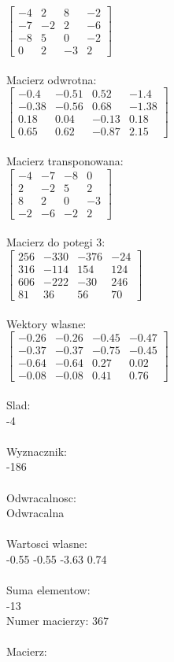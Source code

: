 \documentclass[a4paper,12pt]{article}
\begin{document}
$\begin{bmatrix} -4&2&8&-2\\-7&-2&2&-6\\-8&5&0&-2\\0&2&-3&2 \end{bmatrix}$
\\
\\
Macierz odwrotna:\\

$\begin{bmatrix} -0.4&-0.51&0.52&-1.4\\-0.38&-0.56&0.68&-1.38\\0.18&0.04&-0.13&0.18\\0.65&0.62&-0.87&2.15 \end{bmatrix}$
\\
\\
Macierz transponowana:\\

$\begin{bmatrix} -4&-7&-8&0\\2&-2&5&2\\8&2&0&-3\\-2&-6&-2&2 \end{bmatrix}$
\\
\\
Macierz do potegi 3:\\

$\begin{bmatrix} 256&-330&-376&-24\\316&-114&154&124\\606&-222&-30&246\\81&36&56&70 \end{bmatrix}$
\\
\\
Wektory wlasne:\\

$\begin{bmatrix} -0.26&-0.26&-0.45&-0.47\\-0.37&-0.37&-0.75&-0.45\\-0.64&-0.64&0.27&0.02\\-0.08&-0.08&0.41&0.76 \end{bmatrix}$
\\
\\
Slad:\\
-4
\\
\\
Wyznacznik:\\
-186
\\
\\
Odwracalnosc:\\
Odwracalna
\\
\\
Wartosci wlasne:\\
-0.55 -0.55 -3.63 0.74
\\
\\
Suma elementow:\\
-13
\\
\newpage
Numer macierzy:
367
\\
\\
Macierz:\\
\end{document}
